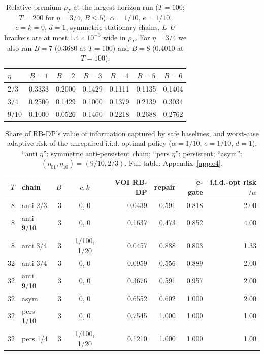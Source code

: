 \documentclass{article}
\theoremstyle{plain}
\theoremstyle{definition}
\theoremstyle{remark}
\newcommand{\rhoG}{\rho_\Gamma}
\begin{document}
\begin{table}[t]
\centering
\caption{Relative premium $\rhoG$ at the largest horizon run ($T=100$; $T=200$ for $\eta=3/4$, $B\le5$), $\alpha=1/10$, $e=1/10$, $c=k=0$, $d=1$, symmetric stationary chains. $L$--$U$ brackets are at most $1.4\times10^{-3}$ wide in $\rhoG$. For $\eta=3/4$ we also ran $B=7$ (0.3680 at $T=100$) and $B=8$ (0.4010 at $T=100$).}
\label{tab:e3}
\small
\begin{tabular}{lcccccc}
\toprule
$\eta$ & $B=1$ & $B=2$ & $B=3$ & $B=4$ & $B=5$ & $B=6$\\
\midrule
2/3 & 0.3333 & 0.2000 & 0.1429 & 0.1111 & 0.1135 & 0.1404\\
3/4 & 0.2500 & 0.1429 & 0.1000 & 0.1379 & 0.2139 & 0.3034\\
9/10 & 0.1000 & 0.0526 & 0.1460 & 0.2218 & 0.2688 & 0.2762\\
\bottomrule
\end{tabular}
\end{table}

\begin{table}[t]
\centering
\caption{Share of RB-DP's value of information captured by safe baselines, and worst-case adaptive risk of the unrepaired i.i.d.-optimal policy ($\alpha=1/10$, $e=1/10$, $d=1$). ``anti $\eta$'': symmetric anti-persistent chain; ``pers $\eta$'': persistent; ``asym'': $(\eta_{01},\eta_{10})=(9/10,2/3)$. Full table: Appendix~\ref{app:e4}.}
\label{tab:e4}
\small
\begin{tabular}{rlrcrrrr}
\toprule
$T$ & chain & $B$ & $c,k$ & VOI RB-DP & repair & e-gate & i.i.d.-opt risk$/\alpha$\\
\midrule
8 & anti 2/3 & 3 & 0, 0 & 0.0439 & 0.591 & 0.818 & 2.00\\
8 & anti 9/10 & 3 & 0, 0 & 0.1637 & 0.473 & 0.852 & 4.00\\
8 & anti 3/4 & 3 & 1/100, 1/20 & 0.0457 & 0.888 & 0.803 & 1.33\\
32 & anti 3/4 & 3 & 0, 0 & 0.0959 & 0.556 & 0.889 & 2.00\\
32 & anti 9/10 & 3 & 0, 0 & 0.3676 & 0.591 & 0.957 & 2.00\\
32 & asym & 3 & 0, 0 & 0.6552 & 0.602 & 1.000 & 2.00\\
32 & pers 1/10 & 3 & 0, 0 & 0.7545 & 1.000 & 1.000 & 1.00\\
32 & pers 1/4 & 3 & 1/100, 1/20 & 0.1210 & 1.000 & 1.000 & 1.00\\
\bottomrule
\end{tabular}
\end{table}
\end{document}
